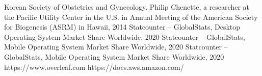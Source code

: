 \documentclass[conference]{IEEEtran}
\begin{document}
\vfill

\begin{thebibliography}{00}
 Korean Society of Obstetrics and Gynecology.
 Philip Chenette, a researcher at the Pacific Utility Center in the U.S. in Annual Meeting of the American Society for Biogenesis (ASRM) in Hawaii, 2014
 Statcounter – GlobalStats, Desktop Operating System Market Share Worldwide, 2020
 Statcounter – GlobalStats, Mobile Operating System Market Share Worldwide, 2020
 Statcounter – GlobalStats, Mobile Operating System Market Share Worldwide, 2020 
 https://www.overleaf.com
 https://docs.aws.amazon.com/

\end{thebibliography}

\newpage
\listoftables
\vspace{1cm}
\listoffigures
\end{document}
